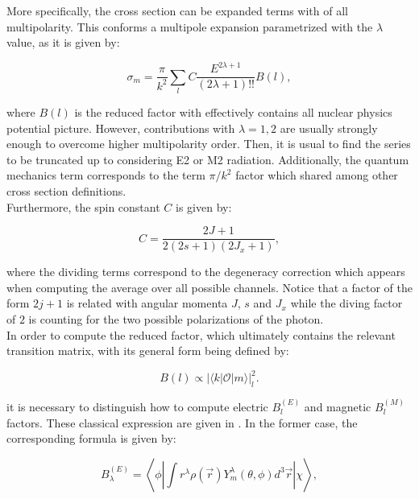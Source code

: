 \documentclass[openany]{book}
\begin{document}
More specifically, the cross section can be expanded terms with of all multipolarity. This conforms a multipole expansion  parametrized with the $\lambda$ value, as it is given by: 

\begin{equation}  \label{eq:radiativeCapture_crossSection_l}
	\sigma_m = \frac{\pi}{k^2} \sum_{l} C \frac{E^{2\lambda +1}}{(2\lambda+1)!!} B(l), 		
\end{equation}

where $B(l)$ is the reduced factor with effectively contains all nuclear physics potential picture. However, contributions with $\lambda = 1, 2$ are usually strongly enough to overcome higher multipolarity order. Then, it is usual to find the series to be truncated up to considering E2 or M2 radiation. Additionally, the quantum mechanics term corresponds to the term $\pi/k^2$ factor which shared among other cross section definitions. \\

Furthermore, the spin constant $C$ is given by: 

\begin{equation} \label{eq:radiativeCapture_spinConstant}
	C =  \frac{ 2J + 1}{2(2s + 1) (2J_x + 1)}, 
\end{equation}

where the dividing terms correspond to the degeneracy correction which appears when computing the average over all possible channels. Notice that a factor of the form $2j +1$ is related with angular momenta $J$, $s$ and $J_x$ while the diving factor of $2$ is counting for the two possible polarizations of the photon.  \\

In order to compute the reduced factor, which ultimately contains the relevant transition matrix, with its general form being defined by:

\begin{equation}  \label{eq:radiativeCapture_reducedFactor}
	B(l) \propto   |{\langle k | \mathcal{O} | m \rangle}|^{2}_{l}.
\end{equation}

 it is necessary to distinguish how to compute electric $B^{(E)}_{l}$ and magnetic $B^{(M)}_{l}$ factors. These classical expression are given in \cite{goldhaber_weneser_1955}. In the former case, the corresponding formula is given by: 

\begin{equation} \label{eq:radiativeCapture_reduced_E}
	B^{(E)}_{\lambda} =   \left \langle \phi  \left|  \int  r^\lambda \rho(\vec r) Y^{\lambda}_{m} (\theta, \phi) d^3 \vec r \right| \chi \right \rangle , 
\end{equation}
\end{document}

